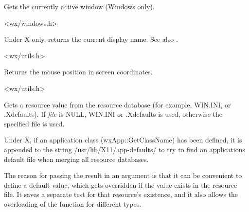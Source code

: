 
Gets the currently active window (Windows only).


<wx/windows.h>


\label{wxgetdisplayname}


Under X only, returns the current display name. See also .


<wx/utils.h>


\label{wxgetmouseposition}


Returns the mouse position in screen coordinates.


<wx/utils.h>


\label{wxgetresource}





Gets a resource value from the resource database (for example, WIN.INI, or
.Xdefaults). If {\it file} is NULL, WIN.INI or .Xdefaults is used,
otherwise the specified file is used.

Under X, if an application class (wxApp::GetClassName) has been defined,
it is appended to the string /usr/lib/X11/app-defaults/ to try to find
an applications default file when merging all resource databases.

The reason for passing the result in an argument is that it
can be convenient to define a default value, which gets overridden
if the value exists in the resource file. It saves a separate
test for that resource's existence, and it also allows
the overloading of the function for different types.

